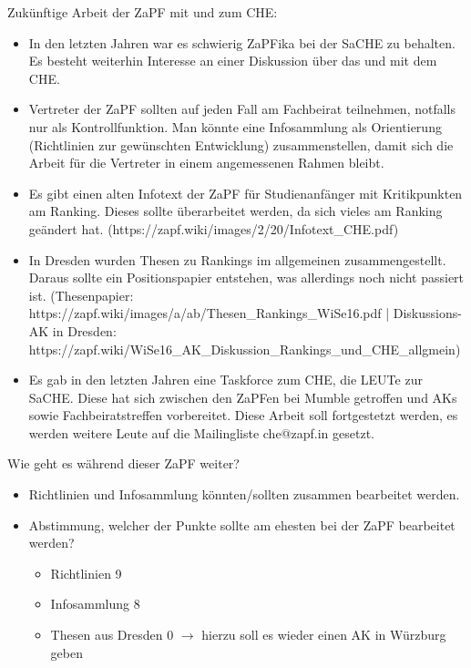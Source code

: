       Zukünftige Arbeit der ZaPF mit und zum CHE:
      \begin{itemize}
        \item In den letzten Jahren war es schwierig ZaPFika bei der SaCHE zu behalten. Es besteht weiterhin Interesse an einer Diskussion über das und mit dem CHE.
        \item Vertreter der ZaPF sollten auf jeden Fall am Fachbeirat teilnehmen, notfalls nur als Kontrollfunktion. Man könnte eine Infosammlung als Orientierung (Richtlinien zur gewünschten Entwicklung) zusammenstellen, damit sich die Arbeit für die Vertreter in einem angemessenen Rahmen bleibt.
        \item Es gibt einen alten Infotext der ZaPF für Studienanfänger mit Kritikpunkten am Ranking. Dieses sollte überarbeitet werden, da sich vieles am Ranking geändert hat. (https://zapf.wiki/images/2/20/Infotext_CHE.pdf)
        \item In Dresden wurden Thesen zu Rankings im allgemeinen zusammengestellt. Daraus sollte ein Positionspapier entstehen, was allerdings noch nicht passiert ist. (Thesenpapier: https://zapf.wiki/images/a/ab/Thesen_Rankings_WiSe16.pdf | Diskussions-AK in Dresden: https://zapf.wiki/WiSe16_AK_Diskussion_Rankings_und_CHE_allgmein)
        \item Es gab in den letzten Jahren eine Taskforce zum CHE, die LEUTe zur SaCHE. Diese hat sich zwischen den ZaPFen bei Mumble getroffen und AKs sowie Fachbeiratstreffen vorbereitet. Diese Arbeit soll fortgestetzt werden, es werden weitere Leute auf die Mailingliste che@zapf.in gesetzt.
      \end{itemize}

      Wie geht es während dieser ZaPF weiter?
      \begin{itemize}
        \item Richtlinien und Infosammlung könnten/sollten zusammen bearbeitet werden.
        \item Abstimmung, welcher der Punkte sollte am ehesten bei der ZaPF bearbeitet werden?
          \begin{itemize}
            \item Richtlinien 9
            \item Infosammlung 8
            \item Thesen aus Dresden 0 $\rightarrow$ hierzu soll es wieder einen AK in Würzburg geben
          \end{itemize}
      \end{itemize}

